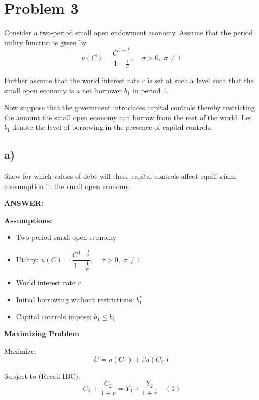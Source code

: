 \documentclass[12pt]{article}
\begin{document}
\section*{\noindent\textbf{Problem 3}}

\doublespacing

Consider a two-period small open endowment economy. Assume that the period utility 
function is given by 
\[
u(C) = \frac{C^{\,1-\tfrac{1}{\sigma}}}{1 - \tfrac{1}{\sigma}}, 
\quad \sigma > 0, \; \sigma \neq 1.
\] 

Further assume that the world interest rate \( r \) is set at such a level such that the small open economy 
is a net borrower \( b_1 \) in period 1. 

Now suppose that the government introduces capital controls thereby restricting the amount 
the small open economy can borrow from the rest of the world. Let \( \bar{b}_1 \) denote the 
level of borrowing in the presence of capital controls.

\subsection*{\noindent\textbf{a)}}

Show for which values of debt will these capital controls affect equilibrium consumption in the small open economy.

\vspace{0.5em}
\noindent\textcolor{formalred}{\textbf{ANSWER:}}

\singlespacing
\textbf{Assumptions:}
\begin{itemize}
    \item Two-period small open economy
    \item Utility: \( u(C) = \dfrac{C^{\,1-\tfrac{1}{\sigma}}}{1 - \tfrac{1}{\sigma}}, \quad \sigma > 0, \; \sigma \neq 1 \)
    \item World interest rate \( r \)
    \item Initial borrowing without restrictions: \( b_1^* \)
    \item Capital controls impose: \( b_1 \leq \bar{b}_1 \)
\end{itemize}

\textbf{Maximizing Problem}

Maximize:  
\[
U = u(C_1) + \beta u(C_2)
\]

Subject to (Recall IBC):  
\[
C_1 + \frac{C_2}{1+r} = Y_1 + \frac{Y_2}{1+r} \quad (1)
\]
\end{document}
